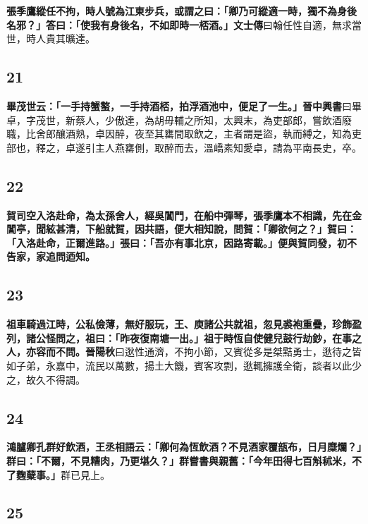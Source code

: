 \textbf{張季鷹縱任不拘，時人號為江東步兵，或謂之曰：「卿乃可縱適一時，獨不為身後名邪？」答曰：「使我有身後名，不如即時一桮酒。」}{\footnotesize \textbf{文士傳}曰翰任性自適，無求當世，時人貴其曠達。}

\subsection*{21}

\textbf{畢茂世云：「一手持蟹螯，一手持酒桮，拍浮酒池中，便足了一生。」}{\footnotesize \textbf{晉中興書}曰畢卓，字茂世，新蔡人，少傲達，為胡毋輔之所知，太興末，為吏部郎，嘗飲酒廢職，比舍郎釀酒熟，卓因醉，夜至其罋間取飲之，主者謂是盜，執而縛之，知為吏部也，釋之，卓遂引主人燕罋側，取醉而去，溫嶠素知愛卓，請為平南長史，卒。}

\subsection*{22}

\textbf{賀司空入洛赴命，為太孫舍人，經吳閶門，在船中彈琴，張季鷹本不相識，先在金閶亭，聞絃甚清，下船就賀，因共語，便大相知說，問賀：「卿欲何之？」賀曰：「入洛赴命，正爾進路。」張曰：「吾亦有事北京，因路寄載。」便與賀同發，初不告家，家追問迺知。}

\subsection*{23}

\textbf{祖車騎過江時，公私儉薄，無好服玩，王、庾諸公共就祖，忽見裘袍重疊，珍飾盈列，諸公怪問之，祖曰：「昨夜復南塘一出。」祖于時恆自使健兒鼓行劫鈔，在事之人，亦容而不問。}{\footnotesize \textbf{晉陽秋}曰逖性通濟，不拘小節，又賓從多是桀黠勇士，逖待之皆如子弟，永嘉中，流民以萬數，揚土大饑，賓客攻剽，逖輒擁護全衛，談者以此少之，故久不得調。}

\subsection*{24}

\textbf{鴻臚卿孔群好飲酒，王丞相語云：「卿何為恆飲酒？不見酒家覆瓿布，日月糜爛？」群曰：「不爾，不見糟肉，乃更堪久？」群嘗書與親舊：「今年田得七百斛秫米，不了麴糵事。」}{\footnotesize 群已見上。}

\subsection*{25}

